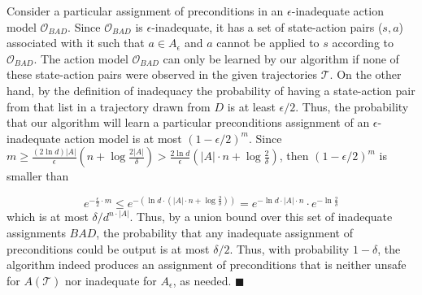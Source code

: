 \documentclass{article}
\newenvironment{proof}{\noindent{\bf Proof:~~}}{\qed}
\newcommand{\qed}{\hfill\ensuremath{\blacksquare}}
\begin{document}
\begin{proof}
		
		Consider a particular assignment of preconditions in an $\epsilon$-inadequate action model $\mathcal{O}_{BAD}$. Since $\mathcal{O}_{BAD}$ is $\epsilon$-inadequate, 
		it has a set of state-action pairs ($s,a$) associated with it such that $a\in A_\epsilon$ and $a$ cannot be applied to $s$ according to $\mathcal{O}_{BAD}$. 
		The action model $\mathcal{O}_{BAD}$ can only be learned by our algorithm 
		if none of these state-action pairs were observed in the given trajectories $\mathcal{T}$. 
		On the other hand, by the definition of inadequacy
		the probability of having a state-action pair from that list 
		in a trajectory drawn from $D$ is at least $\epsilon/2$. 
		Thus, the probability that our algorithm will learn a particular preconditions assignment of an $\epsilon$-inadequate action model is at most $(1-\epsilon/2)^m$.
		Since $m\geq\frac{(2\ln  d)|A|}{\epsilon}(n+\log\frac{2|A|}{\delta})>\frac{2\ln d}{\epsilon}(|A|\cdot n+\log\frac{2}{\delta})$, then $(1-\epsilon/2)^m$ is smaller than 
		
		
		
		\begin{equation}
		e^{-\frac{\epsilon}{2} \cdot m}
		\leq 
		e^{-(\ln d \cdot (|A|\cdot n+\log\frac{2}{\delta}))}
		=e^{-\ln d \cdot |A|\cdot n}\cdot e^{-\ln  \frac{2}{\delta}}
		\end{equation}
		which is at most $\delta/d^{n\cdot |A|}$. Thus, by a union bound over this set of inadequate assignments $BAD$, the probability that any inadequate assignment of preconditions could be output is at most $\delta/2$.
		Thus, with probability $1-\delta$, the algorithm indeed produces an assignment of preconditions that is neither unsafe for $A(\mathcal{T})$ nor inadequate for $A_\epsilon$, as needed.
	\end{proof}
	
\end{document}

